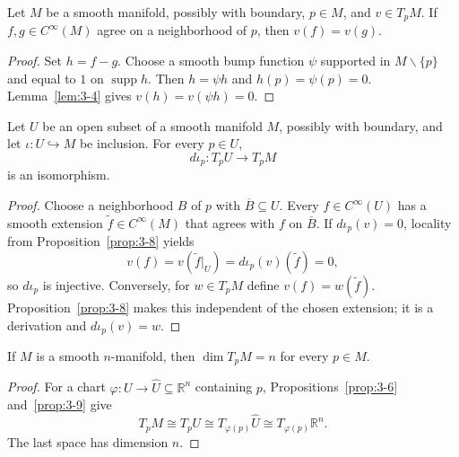 \begin{proposition}
\label{prop:3-8}
\leanok
{}
Let $M$ be a smooth manifold, possibly with boundary, $p\in M$, and
$v\in T_pM$. If $f,g\in C^\infty(M)$ agree on a neighborhood of $p$, then
$v(f)=v(g)$.
\end{proposition}

\begin{proof}
\leanok
\sketch
Set $h=f-g$. Choose a smooth bump function $\psi$ supported in
$M\smallsetminus\{p\}$ and equal to $1$ on $\operatorname{supp}h$. Then
$h=\psi h$ and $h(p)=\psi(p)=0$. Lemma~\ref{lem:3-4} gives $v(h)=v(\psi h)=0$.
\end{proof}

\begin{proposition}
\label{prop:3-9}
\leanok
{}
Let $U$ be an open subset of a smooth manifold $M$, possibly with boundary,
and let $\iota:U\hookrightarrow M$ be inclusion. For every $p\in U$,
\[
d\iota_p:T_pU\longrightarrow T_pM
\]
is an isomorphism.
\end{proposition}

\begin{proof}
\leanok
\sketch
Choose a neighborhood $B$ of $p$ with $\overline B\subseteq U$. Every
$f\in C^\infty(U)$ has a smooth extension $\widetilde f\in C^\infty(M)$ that
agrees with $f$ on $\overline B$. If $d\iota_p(v)=0$, locality from
Proposition~\ref{prop:3-8} yields
\[
v(f)=v(\widetilde f|_U)=d\iota_p(v)(\widetilde f)=0,
\]
so $d\iota_p$ is injective. Conversely, for $w\in T_pM$ define
$v(f)=w(\widetilde f)$. Proposition~\ref{prop:3-8} makes this independent of the chosen
extension; it is a derivation and $d\iota_p(v)=w$.
\end{proof}

\begin{proposition}
\label{prop:3-10}
\leanok
{}
If $M$ is a smooth $n$-manifold, then $\dim T_pM=n$ for every $p\in M$.
\end{proposition}

\begin{proof}
\leanok
\sketch
For a chart $\varphi:U\to\widehat U\subseteq\mathbb{R}^n$ containing $p$,
Propositions~\ref{prop:3-6} and~\ref{prop:3-9} give
\[
T_pM\cong T_pU\cong T_{\varphi(p)}\widehat U
\cong T_{\varphi(p)}\mathbb{R}^n.
\]
The last space has dimension $n$.
\end{proof}

